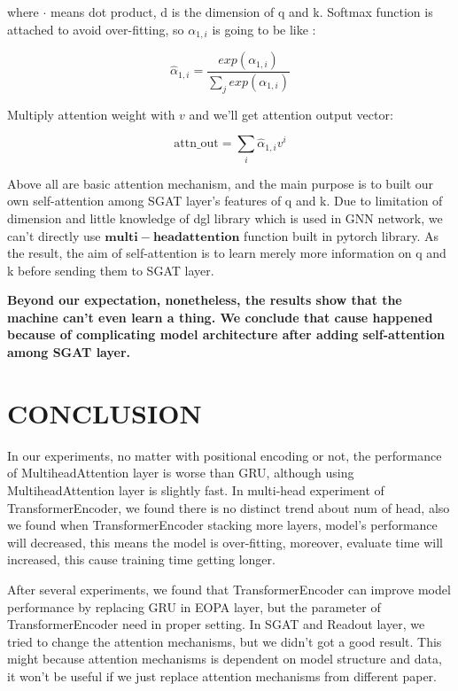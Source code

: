\documentclass{article}
\begin{document}
where $\cdotp$ means dot product, d is the dimension of q and k.
Softmax function is attached to avoid over-fitting,
so $\alpha_{1,i}$ is going to be like :

\begin{equation}
    \hat{\alpha}_{1,i}  = \frac{exp(\alpha_{1,i})}{\sum_jexp(\alpha_{1,i})}
\end{equation}

Multiply attention weight with $v$ and we'll get attention output vector:

\begin{equation}
    \textrm{attn\_out} = \sum_i\hat{\alpha}_{1,i}v^i
\end{equation}

Above all are basic attention mechanism,
and the main purpose is to built our own self-attention among
SGAT layer's features of q and k.
Due to limitation of dimension and little knowledge of
dgl library which is used in GNN network,
we can't directly use $\bm{multi-head attention}$ function built
in pytorch library. As the result, the aim of self-attention
is to learn merely more information on q and k
before sending them to SGAT layer.

\textbf{Beyond our expectation,
    nonetheless, the results show that the machine can't even learn a thing.
    We conclude that cause happened because of complicating model architecture
    after adding self-attention among SGAT layer.}


\section{CONCLUSION}

In our experiments, no matter with positional encoding or not,
the performance of MultiheadAttention layer is worse than GRU,
although using MultiheadAttention layer is slightly fast.
In multi-head experiment of TransformerEncoder,
we found there is no distinct trend about num of head,
also we found when TransformerEncoder stacking more layers,
model's performance will decreased, this means the model is over-fitting,
moreover, evaluate time will increased, this cause training time getting longer.

After several experiments, we found that TransformerEncoder can improve
model performance by replacing GRU in EOPA layer,
but the parameter of TransformerEncoder need in proper setting.
In SGAT and Readout layer, we tried to change the attention mechanisms,
but we didn't got a good result.
This might because attention mechanisms is dependent on model structure and data,
it won't be useful if we just replace attention mechanisms from different paper.
\end{document}
